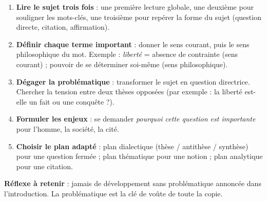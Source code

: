 \documentclass[11pt]{article}
\newcommand{\cle}[1]{{\popxbold\color{popdark}#1}}
\begin{document}
\begin{methode}
\begin{enumerate}
\item \textbf{Lire le sujet trois fois} : une première lecture globale, une deuxième pour souligner les mots-clés, une troisième pour repérer la forme du sujet (question directe, citation, affirmation).
\item \textbf{Définir chaque terme important} : donner le sens courant, puis le sens philosophique du mot. Exemple : \emph{liberté} = absence de contrainte (sens courant) ; pouvoir de se déterminer soi-même (sens philosophique).
\item \textbf{Dégager la problématique} : transformer le sujet en question directrice. Chercher la tension entre deux thèses opposées (par exemple : la liberté est-elle un fait ou une conquête ?).
\item \textbf{Formuler les enjeux} : se demander \emph{pourquoi cette question est importante} pour l'homme, la société, la cité.
\item \textbf{Choisir le plan adapté} : plan dialectique (thèse / antithèse / synthèse) pour une question fermée ; plan thématique pour une notion ; plan analytique pour une citation.
\end{enumerate}
\textbf{Réflexe à retenir} : jamais de développement sans problématique annoncée dans l'introduction. La problématique est la \cle{clé de voûte} de toute la copie.
\end{methode}
\end{document}
